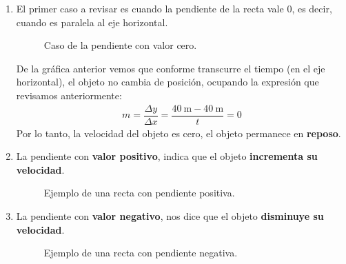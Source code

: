 \documentclass[14pt]{extarticle}
\newcommand{\textocolor}[2]{\textbf{\textcolor{#1}{#2}}}
\begin{document}
\begin{enumerate}
\item El primer caso a revisar es cuando la pendiente de la recta vale $0$, es decir, cuando es paralela al eje horizontal.
\begin{figure}[H]
    \centering
    \caption{Caso de la pendiente con valor cero.}
\end{figure}
De la gráfica anterior vemos que conforme transcurre el tiempo (en el eje horizontal), el objeto no cambia de posición, ocupando la expresión que revisamos anteriormente:
\begin{align*}
m = \dfrac{\Delta y}{\Delta x} =  \dfrac{\SI{40}{\meter} - \SI{40}{\meter}}{t} = 0
\end{align*}
Por lo tanto, la velocidad del objeto es cero, el objeto permanece en \textocolor{crimsonglory}{reposo}.

\item La pendiente con \textocolor{cadmiumgreen}{valor positivo}, indica que el objeto \textocolor{cadmiumgreen}{incrementa su velocidad}.
\begin{figure}[H]
    \centering
    \caption{Ejemplo de una recta con pendiente positiva.}
\end{figure}
\item La pendiente con \textocolor{carmine}{valor negativo}, nos dice que el objeto \textocolor{carmine}{disminuye su velocidad}.
\begin{figure}[H]
    \centering
    \caption{Ejemplo de una recta con pendiente negativa.}
\end{figure}
\end{enumerate}
\end{document}
